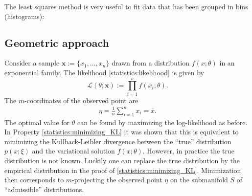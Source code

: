 
    The least squares method is very useful to fit data that has been grouped in bins (histograms):

\subsection{Geometric approach}

    Consider a sample $\mathbf{x}:=\{x_1,\ldots,x_n\}$ drawn from a distribution $f(x;\theta)$ in an exponential family. The likelihood \ref{statistics:likelihood} is given by \[\mathcal{L}(\theta;\mathbf{x}) := \prod_{i=1}^nf(x_i;\theta).\] The $m$-coordinates of the observed point are
    \begin{gather}
        \eta = \frac{1}{n}\sum_{i=1}^nx_i = \overline{x}.
    \end{gather}
    The optimal value for $\theta$ can be found by maximizing the log-likelihood as before. In Property \ref{statistics:minimizing_KL} it was shown that this is equivalent to minimizing the Kullback-Leibler divergence between the ``true'' distribution $p(x;\xi)$ and the variational solution $f(x;\theta)$. However, in practice the true distribution is not known. Luckily one can replace the true distribution by the empirical distribution in the proof of \ref{statistics:minimizing_KL}. Minimization then corresponds to $m$-projecting the observed point $\eta$ on the submanifold $S$ of ``admissible'' distributions.

